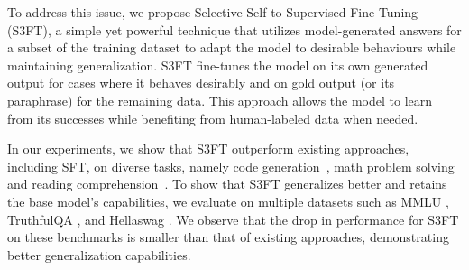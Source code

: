 To address this issue, we propose Selective Self-to-Supervised Fine-Tuning (S3FT), a simple yet powerful technique that utilizes model-generated answers for a subset of the training dataset to adapt the model to desirable behaviours while maintaining generalization. S3FT fine-tunes the model on its own generated output for cases where it behaves desirably and on gold output (or its paraphrase) for the remaining data. This approach allows the model to learn from its successes while benefiting from human-labeled data when needed. 


In our experiments, we show that S3FT outperform existing approaches, including SFT, on diverse tasks, namely code generation~\citet{austin2021program}, math problem solving~\cite{cobbe2021training} and reading comprehension~\cite{kwiatkowski2019natural}. To show that S3FT generalizes better and retains the base model's capabilities, we evaluate on multiple datasets such as MMLU \cite{mmlu}, TruthfulQA \cite{truthfulqa}, and Hellaswag \cite{hellaswag}. We observe that the drop in performance for S3FT on these benchmarks is smaller than that of existing approaches, demonstrating better generalization capabilities.
